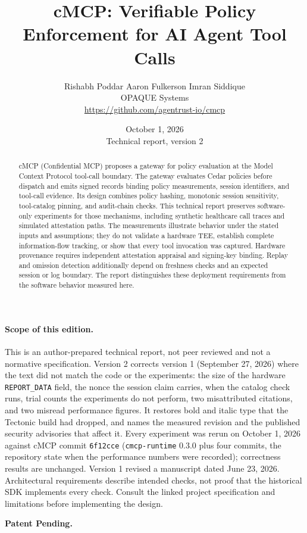 \documentclass[10pt,letterpaper]{article}
\title{\textbf{cMCP: Verifiable Policy Enforcement for AI Agent Tool Calls}}
\author{
  Rishabh Poddar \quad Aaron Fulkerson \quad Imran Siddique \\
  OPAQUE Systems \\[4pt]
  \normalsize \url{https://github.com/agentrust-io/cmcp}
}
\date{October 1, 2026 \\ \small Technical report, version 2}
\newcounter{claim}
\begin{document}
\maketitle

\begin{abstract}
cMCP (Confidential MCP) proposes a gateway for policy evaluation at the
Model Context Protocol tool-call boundary. The gateway evaluates Cedar policies
before dispatch and emits signed records binding policy measurements, session
identifiers, and tool-call evidence. Its design combines policy hashing,
monotonic session sensitivity, tool-catalog pinning, and audit-chain checks.
This technical report preserves software-only experiments for those mechanisms,
including synthetic healthcare call traces and simulated attestation paths.
The measurements illustrate behavior under the stated inputs and assumptions;
they do not validate a hardware TEE, establish complete information-flow tracking,
or show that every tool invocation was captured. Hardware provenance requires
independent attestation appraisal and signing-key binding. Replay and omission
detection additionally depend on freshness checks and an expected session or log
boundary. The report distinguishes these deployment requirements from the
software behavior measured here.
\end{abstract}

\paragraph{Scope of this edition.}
This is an author-prepared technical report, not peer reviewed and not a
normative specification. Version 2 corrects version 1 (September 27, 2026) where the
text did not match the code or the experiments: the size of the hardware
\texttt{REPORT\_DATA} field, the nonce the session claim carries, when the catalog check
runs, trial counts the experiments do not perform, two misattributed citations, and two
misread performance figures. It restores bold and italic type that the Tectonic build had dropped, and names the measured revision and the published
security advisories that affect it. Every experiment was rerun on October 1, 2026 against
cMCP commit \texttt{6f12cce} (\texttt{cmcp-runtime} 0.3.0 plus four commits, the
repository state when the performance numbers were recorded); correctness results are
unchanged. Version 1 revised a manuscript dated June 23, 2026. Architectural requirements describe intended checks, not proof that
the historical SDK implements every check. Consult the linked project
specification and limitations before implementing the design.

\noindent\textbf{Patent Pending.}

\tableofcontents
\newpage











\end{document}
